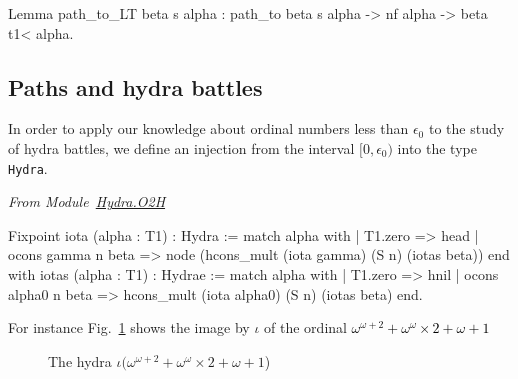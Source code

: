 \begin{Coqsrc}
Lemma path_to_LT beta s alpha :
  path_to beta s alpha -> nf alpha -> beta t1< alpha.
\end{Coqsrc}

\subsection{Paths and hydra battles}
\label{KS-o2h}

In order to apply our knowledge about  ordinal numbers less than $\epsilon_0$ to the study of hydra battles, we define an injection
from the interval $[0,\epsilon_0)$ into the type \texttt{Hydra}.

\vspace{4pt}

\emph{From Module~\href{../theories/html/hydras.Hydra.O2H.html}{Hydra.O2H}}


\begin{Coqsrc}
Fixpoint iota (alpha : T1) : Hydra :=
  match alpha with
  | T1.zero => head
  | ocons gamma n beta => 
         node (hcons_mult (iota gamma) (S n) (iotas beta))
  end 
with iotas (alpha : T1) :  Hydrae :=
       match alpha with
       | T1.zero => hnil
       | ocons alpha0 n beta  => 
           hcons_mult (iota alpha0) (S n) (iotas beta)
       end.
\end{Coqsrc}  




For instance Fig.~\ref{fig:iota-example} shows the image by $\iota$ of the ordinal  \textcolor{black}{$\omega^{\omega+2}+\omega^\omega \times 2 + \omega + 1$}

  \begin{figure}[htb]
\centering
{}
\caption{The hydra $\iota(\omega^{\omega+2}+\omega^\omega \times 2 + \omega + 1$) \label{fig:iota-example}}

\end{figure}



